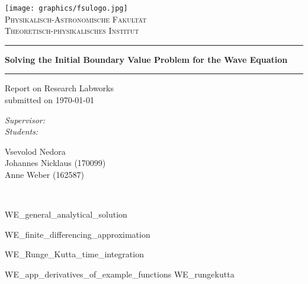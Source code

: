 \documentclass[a4paper,headsepline,12pt,oneside]{scrartcl}
\begin{document}
\begin{titlepage}

\thispagestyle{empty}
    \makeatletter
    \centering
    \texttt{[image: graphics/fsulogo.jpg]}\\[1.0 cm]
    \textsc{\Large Physikalisch-Astronomische Fakultät\\Theoretisch-physikalisches Institut}
    \vspace{1cm} \hrule \vspace{0.4cm}
    \Large \textbf{Solving the Initial Boundary Value Problem for the Wave Equation}
    \vspace{0.4cm} \hrule \vspace{1cm}
    \Large Report on Research Labworks \\
    submitted on \today \\
    \vspace{1cm}
    {\centering
    }

    \begin{minipage}[t]{0.4\textwidth}
        \begin{flushright} \large
            \emph{Supervisor:}\\
            \emph{Students:}
         \end{flushright}
    \end{minipage}%
    \hspace{0.5cm}
    \begin{minipage}[t]{0.4\textwidth}
    \begin{flushleft} \large
          Vsevolod Nedora \\
          Johannes Nicklaus (170099) \\ Anne Weber (162587)
    \end{flushleft}
    \end{minipage}\\[2 cm]
    \makeatother
\end{titlepage}









\newpage
\setcounter{page}{0}
\tableofcontents
\clearpage
\setcounter{page}{1}

{WE_general_analytical_solution}

\clearpage

{WE_finite_differencing_approximation}
\clearpage

{WE_Runge_Kutta_time_integration}


\clearpage
\clearpage
\appendix
{WE_app_derivatives_of_example_functions}
{WE_rungekutta}
\end{document}
